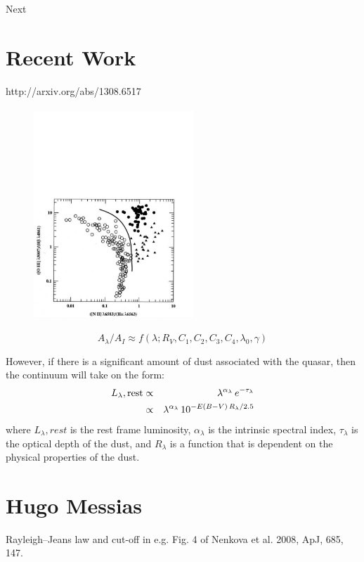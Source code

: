 \documentclass[11pt]{article}
\begin{document}
Next

\section{Recent Work}
http://arxiv.org/abs/1308.6517


\begin{figure}
    \includegraphics[height=8.0cm,width=6.0cm]
     {BPT.pdf}
     \caption[]{}
\end{figure}

\begin{equation}
A_\lambda/A_I \approx f (\lambda; R_V ,C_1,C_2,C_3,C_4,\lambda_0,\gamma)
\end{equation}


However, if there is a significant amount of dust associated with the quasar, then the continuum will take on the form:
\begin{eqnarray}
  L_{\lambda},{\rm rest} &\propto& \lambda^{\alpha_{\lambda}} \, e^{-\tau_{\lambda}}\\
  &\propto& \lambda^{\alpha_{\lambda}} \, 10^{-E(B-V) \, R_{\lambda}/2.5}
\end{eqnarray}
where $L_{\lambda},rest$ is the rest frame luminosity, $\alpha_{\lambda}$ is the intrinsic spectral index, $\tau_{\lambda}$ is the optical depth of the dust, and $R_{\lambda}$ is a function that is dependent on the physical properties of the dust.


\newpage

\section{Hugo Messias}
Rayleigh–Jeans law and cut-off in e.g. Fig. 4 of Nenkova et al. 2008, ApJ, 685, 147. 
\end{document}
